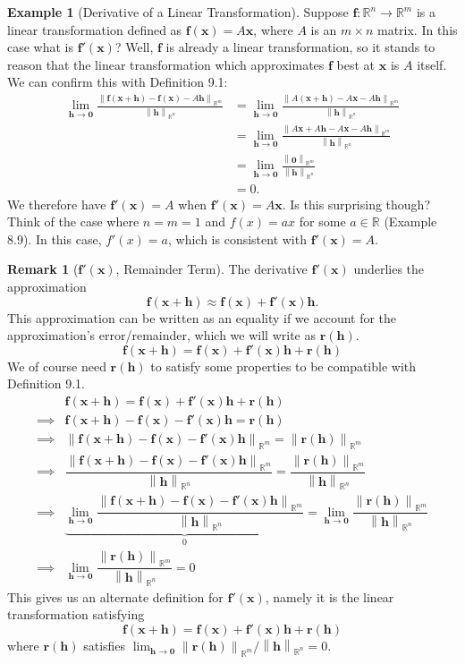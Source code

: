 \documentclass{article}
\newcommand{\R}{\mathbb{R}}
\newcommand{\x}{\mathbf{x}}
\newcommand{\f}{\mathbf{f}}
\newcommand{\h}{\mathbf{h}}
\newcommand{\ze}{\mathbf{0}}
\newcommand{\norm}[1]{\left\lVert#1\right\rVert}
\theoremstyle{definition}
\newtheorem{example}{Example}[section]
\newtheorem{remark}{Remark}[section]
\begin{document}
\begin{example}[Derivative of a Linear Transformation]
Suppose $ \f:\R^n\to \R^m $ is a linear transformation defined as $ \f(\x)=A\x $, where  $ A $ is an $ m\times n $ matrix. In this case what is $ \f'(\x) $? Well, $ \f $ is already a linear transformation, so it stands to reason that the linear transformation which approximates $ \f $ best at $ \x $ is $ A $ itself. We can confirm this with Definition 9.1:
\begin{align*}
	\lim\limits_{\mathbf h\to \ze}\frac{\norm{\f(\x+\mathbf h) - \f(\x)-A\mathbf{h}}_{\R^m}}{\norm{\mathbf h}_{\R^n}} & = 	\lim\limits_{\mathbf h\to \ze}\frac{\norm{A(\x+\mathbf h) - A\x-A\mathbf{h}}_{\R^m}}{\norm{\mathbf h}_{\R^n}} \\ & = 	\lim\limits_{\mathbf h\to \ze}\frac{\norm{A\x+ A\mathbf h - A\x-A\mathbf{h}}_{\R^m}}{\norm{\mathbf h}_{\R^n}}\\
	& = \lim\limits_{\mathbf h\to \ze}\frac{\norm{\ze}_{\R^m}}{\norm{\mathbf h}_{\R^n}}\\ & = 0.
\end{align*}
We therefore have $ \f'(\x)= A $ when $ \f'(\x)=A\x $. Is this surprising though? Think of the case where $ n=m=1 $ and $ f(x)=ax $ for some $ a\in \R $ (Example 8.9). In this case, $ f'(x)=a $, which is consistent with $ \f'(\x) = A$. 
\end{example}
\begin{remark}[$ \f'(\x) $,  Remainder Term]
The derivative $ \f'(\x) $ underlies the approximation 
$$\f(\x+\h) \approx \f(\x) + \f'(\x)\h .$$ This approximation can be written as an equality if we account for the approximation's error/remainder, which we will write as $ \mathbf r(\h) $. $$ \f(\x+\h) = \f(\x) + \f'(\x)\h + \mathbf r(\h) $$ 
We of course need $ \mathbf r(\h) $ to satisfy some properties to be compatible with Definition 9.1. 
\begin{align*}
 & \f(\x+\h) = \f(\x) + \f'(\x)\h + \mathbf r(\h)\\
 \implies & \f(\x+\h) - \f(\x) - \f'(\x)\h   =  \mathbf r(\h)\\ 
 \implies & \norm{\f(\x+\h) - \f(\x) - \f'(\x)\h}_{\R^m} = \norm{\mathbf r(\h)}_{\R^m}\\
  \implies & \dfrac{\norm{\f(\x+\h) - \f(\x) - \f'(\x)\h}_{\R^m}}{\norm{\h}_{\R^n}} = \dfrac{\norm{\mathbf r(\h)}_{\R^m}}{\norm{\h}_{\R^n}}\\
    \implies & \underbrace{\lim\limits_{\mathbf h\to \ze}\dfrac{\norm{\f(\x+\h) - \f(\x) - \f'(\x)\h}_{\R^m}}{\norm{\h}_{\R^n}}}_0 = \lim\limits_{\mathbf h\to \ze}\dfrac{\norm{\mathbf r(\h)}_{\R^m}}{\norm{\h}_{\R^n}} \\
    \implies & \lim\limits_{\mathbf h\to \ze}\dfrac{\norm{\mathbf r(\h)}_{\R^m}}{\norm{\h}_{\R^n}} = 0
\end{align*}
This gives us an alternate definition for $ \f'(\x) $, namely it is the linear transformation satisfying 
$$ \f(\x+\h) = \f(\x) + \f'(\x)\h + \mathbf r(\h) $$ where $ \mathbf r(\h) $ satisfies  $\lim_{\mathbf h\to \ze}{\norm{\mathbf r(\h)}_{\R^m}}/{\norm{\h}_{\R^n}} = 0$.
\end{remark}
\end{document}
